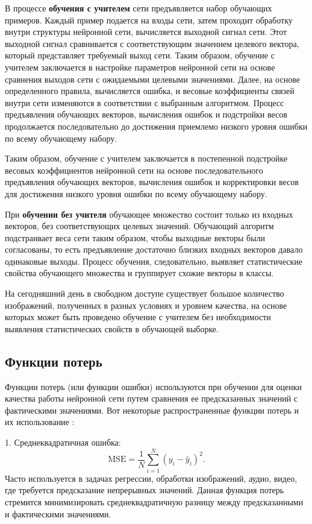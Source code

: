 В процессе \textbf{обучения с учителем} сети предъявляется набор обучающих примеров. Каждый пример подается на входы сети, затем проходит обработку внутри структуры нейронной сети, вычисляется выходной сигнал сети. Этот выходной сигнал сравнивается с соответствующим значением целевого вектора, который представляет требуемый выход сети. Таким образом, обучение с учителем заключается в настройке параметров нейронной сети на основе сравнения выходов сети с ожидаемыми целевыми значениями. Далее, на основе определенного правила, вычисляется ошибка, и весовые коэффициенты связей внутри сети изменяются в соответствии с выбранным алгоритмом. Процесс предъявления обучающих векторов, вычисления ошибок и подстройки весов продолжается последовательно до достижения приемлемо низкого уровня ошибки по всему обучающему набору.

Таким образом, обучение с учителем заключается в постепенной подстройке весовых коэффициентов нейронной сети на основе последовательного предъявления обучающих векторов, вычисления ошибок и корректировки весов для достижения низкого уровня ошибки по всему обучающему набору.

При \textbf{обучении без учителя} обучающее множество состоит только из входных векторов, без соответствующих целевых значений. Обучающий алгоритм подстраивает веса сети таким образом, чтобы выходные векторы были согласованы, то есть предъявление достаточно близких входных векторов давало одинаковые выходы. Процесс обучения, следовательно, выявляет статистические свойства обучающего множества и группирует схожие векторы в классы.

На сегодняшний день в свободном доступе существует большое количество изображений, полученных в разных условиях и уровнем качества, на основе которых может быть проведено обучение с учителем без необходимости выявления статистических свойств в обучающей выборке.

\subsection{Функции потерь}

Функции потерь (или функции ошибки) используются при обучении для оценки качества работы нейронной сети путем сравнения ее предсказанных значений с фактическими значениями. Вот некоторые распространенные функции потерь и их использование \cite{losses}:

1. Среднеквадратичная ошибка:
\begin{equation}
   \text{MSE} = \frac{1}{N}\sum_{i=1}^{N}(y_i - \hat{y}_i)^2.
\end{equation}
Часто используется в задачах регрессии, обработки изображений, аудио, видео, где требуется предсказание непрерывных значений. Данная функция потерь стремится минимизировать среднеквадратичную разницу между предсказанными и фактическими значениями.

